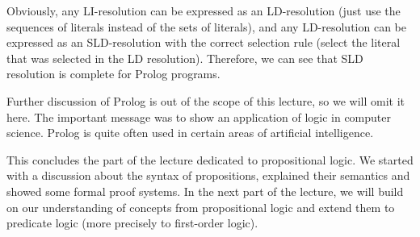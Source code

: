 Obviously, any LI-resolution can be expressed as an LD-resolution (just use the sequences of literals instead of the sets of literals), and any LD-resolution can be expressed as an SLD-resolution with the correct selection rule
 (select the literal that was selected in the LD resolution). Therefore, we can see that SLD resolution is complete for Prolog programs.

Further discussion of Prolog is out of the scope of this lecture, so we will omit it here. The important message was to show an application of logic in computer science. Prolog is quite often used in certain areas of artificial intelligence.

\bigskip

This concludes the part of the lecture dedicated to propositional logic. We started with a discussion about the syntax of propositions, explained their semantics and showed some formal proof systems. In the next part of the lecture, we will build on our understanding of concepts from  propositional logic and extend them to predicate logic (more precisely to first-order logic).
